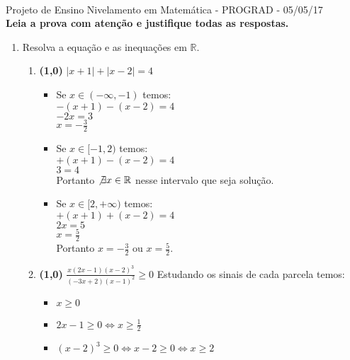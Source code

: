\documentclass[a4paper,12pt]{article}
\newcommand{\RR}{\mathbb{R}}
\newcommand{\ds}{\displaystyle}
\begin{document}
\vspace{5mm}
\\[3mm]
 {\large Projeto de Ensino Nivelamento em Matemática - PROGRAD - 05/05/17}\\[3mm]
{\bf Leia a prova  com atenção e justifique todas as respostas.}

\vspace{5mm}
\begin{enumerate}
	\item  Resolva a equação e as inequações em $\RR$.
\begin{enumerate}
\vspace{5mm}
\item {\bf (1,0)} $\ds |x+1|+|x-2|=4$
\vspace{3mm}
\begin{itemize}
  \item Se $x\in(-\infty,-1)$ temos:\\
  $-(x+1)-(x-2)=4$\\
  $-2x=3$\\
  $x=- \frac{3}{2}$\\
  \item Se $x\in[-1,2)$ temos:\\
  $+(x+1)-(x-2)=4$\\
  $3=4$\\
  Portanto $\not\exists x\in \mathbb{R}$ nesse intervalo que seja solução.\\
  \item Se  $x\in[2,+\infty)$ temos:\\
  $+(x+1)+(x-2)=4$\\
  $2x=5$\\
  $x=\frac{5}{2}$\\
  Portanto $x=- \frac{3}{2}$ ou $x=\frac{5}{2}$.\\
  \end{itemize}
\item {\bf (1,0)} $\ds \frac{x(2x-1)(x-2)^3}{(-3x+2)(x-1)^2}\geq 0  $
\vspace{3mm}
Estudando os sinais de cada parcela temos:
  \begin{itemize}
   \item $x\geq0$\\
   \item $2x-1\geq0 \Leftrightarrow x\geq\frac{1}{2}$\\
   \item $(x-2)^3\geq0 \Leftrightarrow x-2\geq0 \Leftrightarrow x\geq2$\\

\end{itemize}
\end{enumerate}
\end{enumerate}
\end{document}
